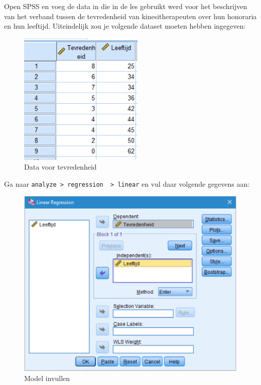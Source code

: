 \documentclass[
]{book}
\theoremstyle{definition}
\theoremstyle{definition}
\theoremstyle{definition}
\theoremstyle{definition}
\theoremstyle{remark}
\begin{document}
Open SPSS en voeg de data in die in de les gebruikt werd voor het beschrijven van het verband tussen de tevredenheid van kinesitherapeuten over hun honoraria en hun leeftijd. Uiteindelijk zou je volgende dataset moeten hebben ingegeven:

\begin{figure}
\includegraphics[width=1\linewidth]{img/ex_spss_lm_1} \caption{Data voor tevredenheid}\label{fig:exspsslm1}
\end{figure}

Ga naar \texttt{analyze\ \textgreater{}\ regression\ \ \textgreater{}\ linear} en vul daar volgende gegevens aan:

\begin{figure}
\includegraphics[width=1\linewidth]{img/ex_spss_lm_2} \caption{Model invullen}\label{fig:exspsslm2}
\end{figure}
\end{document}
